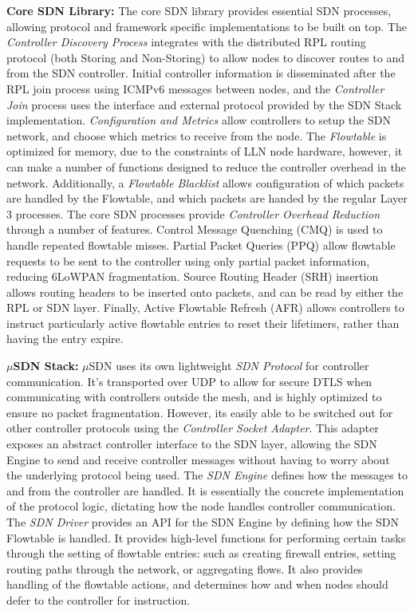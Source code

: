 \textbf{Core SDN Library:} The core SDN library provides essential SDN processes, allowing protocol and framework specific implementations to be built on top. The \textit{Controller Discovery Process} integrates with the distributed RPL routing protocol (both Storing and Non-Storing) to allow nodes to discover routes to and from the SDN controller. Initial controller information is disseminated after the RPL join process using ICMPv6 messages between nodes, and the \textit{Controller Join} process uses the interface and external protocol provided by the SDN Stack implementation. \textit{Configuration and Metrics} allow controllers to setup the SDN network, and choose which metrics to receive from the node. The \textit{Flowtable} is optimized for memory, due to the constraints of LLN node hardware, however, it can make a number of functions designed to reduce the controller overhead in the network. Additionally, a \textit{Flowtable Blacklist} allows configuration of which packets are handled by the Flowtable, and which packets are handed by the regular Layer 3 processes. The core SDN processes provide \textit{Controller Overhead Reduction} through a number of features. Control Message Quenching (CMQ) \cite{cmq} is used to handle repeated flowtable misses. Partial Packet Queries (PPQ) allow flowtable requests to be sent to the controller using only partial packet information, reducing 6LoWPAN fragmentation. Source Routing Header (SRH) insertion allows routing headers to be inserted onto packets, and can be read by either the RPL or SDN layer. Finally, Active Flowtable Refresh (AFR) allows controllers to instruct particularly active flowtable entries to reset their lifetimers, rather than having the entry expire.  

\textbf{$\mu$SDN Stack:} $\mu$SDN uses its own lightweight \textit{SDN Protocol} for controller communication. It's transported over UDP to allow for secure DTLS when communicating with controllers outside the mesh, and is highly optimized to ensure no packet fragmentation. However, its easily able to be switched out for other controller protocols using the \textit{Controller Socket Adapter}. This adapter exposes an abstract controller interface to the SDN layer, allowing the SDN Engine to send and receive controller messages without having to worry about the underlying protocol being used. The \textit{SDN Engine} defines how the messages to and from the controller are handled. It is essentially the concrete implementation of the protocol logic, dictating how the node handles controller communication. The \textit{SDN Driver} provides an API for the SDN Engine by defining how the SDN Flowtable is handled. It provides high-level functions for performing certain tasks through the setting of flowtable entries: such as creating firewall entries, setting routing paths through the network, or aggregating flows. It also provides handling of the flowtable actions, and determines how and when nodes should defer to the controller for instruction.

